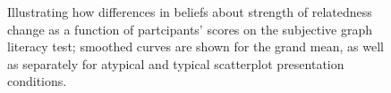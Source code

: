 \documentclass[manuscript,screen,review]{acmart}
\begin{document}
\begin{figure}


\caption{\label{fig-emo-smooth}Illustrating how differences in beliefs
about strength of relatedness change as a function of partcipants'
scores on the subjective graph literacy test; smoothed curves are shown
for the grand mean, as well as separately for atypical and typical
scatterplot presentation conditions.}

\end{figure}%
\end{document}

